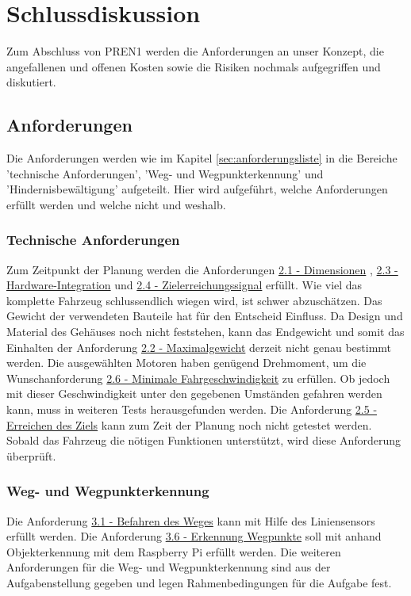 \documentclass[../main.tex]{subfiles}
\begin{document}
\newpage
\section{Schlussdiskussion}

Zum Abschluss von PREN1 werden die Anforderungen an unser Konzept, die angefallenen und offenen Kosten sowie die Risiken nochmals aufgegriffen und diskutiert.
\subsection{Anforderungen}
Die Anforderungen werden wie im Kapitel \ref{sec:anforderungsliste} in die Bereiche 'technische Anforderungen', 'Weg- und Wegpunkterkennung' und 'Hindernisbewältigung' aufgeteilt. Hier wird aufgeführt, welche Anforderungen erfüllt werden und welche nicht und weshalb.

\subsubsection{Technische Anforderungen}
Zum Zeitpunkt der Planung werden die Anforderungen \hyperlink{A2.1}{2.1 - Dimensionen} , \hyperlink{A2.3}{2.3 - Hardware-Integration} und \hyperlink{A2.4}{2.4 - Zielerreichungssignal} erfüllt. Wie viel das komplette Fahrzeug schlussendlich wiegen wird, ist schwer abzuschätzen. Das Gewicht der verwendeten Bauteile hat für den Entscheid Einfluss. Da Design und Material des Gehäuses noch nicht feststehen, kann das Endgewicht und somit das Einhalten der Anforderung \hyperlink{A2.2}{2.2 - Maximalgewicht} derzeit nicht genau bestimmt werden. Die ausgewählten Motoren haben genügend Drehmoment, um die Wunschanforderung \hyperlink{A2.6}{2.6 - Minimale Fahrgeschwindigkeit} zu erfüllen. Ob jedoch mit dieser Geschwindigkeit unter den gegebenen Umständen gefahren werden kann, muss in weiteren Tests herausgefunden werden.
Die Anforderung \hyperlink{A2.5}{2.5 - Erreichen des Ziels} kann zum Zeit der Planung noch nicht getestet werden. Sobald das Fahrzeug die nötigen Funktionen unterstützt, wird diese Anforderung überprüft.

\subsubsection{Weg- und Wegpunkterkennung}
Die Anforderung \hyperlink{A3.1}{3.1 - Befahren des Weges} kann mit Hilfe des Liniensensors erfüllt werden. Die Anforderung \hyperlink{A3.6}{3.6 - Erkennung Wegpunkte} soll mit anhand Objekterkennung mit dem Raspberry Pi erfüllt werden. Die weiteren Anforderungen für die Weg- und Wegpunkterkennung sind aus der Aufgabenstellung gegeben und legen Rahmenbedingungen für die Aufgabe fest.
\end{document}
